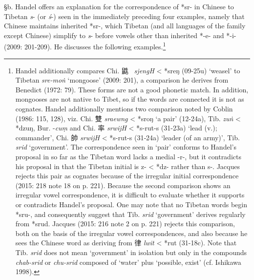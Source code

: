 §b. Handel offers an explanation for the correspondence of *sr- in
Chinese to Tibetan \emph{s}- (or \emph{ś}-) seen in the immediately
preceding four examples, namely that Chinese maintains inherited *sr-,
which Tibetan (and all languages of the family except Chinese) simplify
to \emph{s}- before vowels other than inherited *-e- and *-i- (2009:
201-209). He discusses the following examples.\footnote{Handel
  additionally compares Chi. 鼪~ \emph{sjengH} \textless{} *sreŋ (09-25u)
  `weasel' to Tibetan {} \emph{sre-moṅ} `mongoose' (2009: 201), a
  comparison he derives from Benedict (1972: 79). These forms are not a
  good phonetic match. In addition, mongooses are not native to Tibet,
  so if the words are connected it is not as cognates. Handel
  additionally mentions two comparison noted by Coblin (1986: 115, 128),
  viz. Chi. 雙  \emph{sraewng} \textless{} *s{}roŋ `a pair' (12-24a), Tib. {} \emph{zuṅ} \textless{} *dzuŋ, Bur.{} -\emph{cuṃ} and Chi. 率
   \emph{srwijH} \textless{} *s-rut-s (31-23a) `lead (v.); commander',
  Chi. 帥 \emph{srwijH} \textless{} *s-rut-s (31‑24a) `leader (of an
  army)', Tib. {} \emph{srid} `government'. The correspondence seen
  in `pair' conforms to Handel's proposal in so far as the Tibetan word
  lacks a medial -r-, but it contradicts his proposal in that the
  Tibetan initial is z- \textless{} *dz- rather than s-. Jacques rejects
  this pair as cognates because of the irregular initial correspondence
  (2015: 218 note 18 on p. 221). Because the second comparison shows an
  irregular vowel correspondence, it is difficult to evaluate whether it
  supports or contradicts Handel's proposal. One may note that no
  Tibetan words begin *sru-, and consequently suggest that Tib. {} \emph{srid} `government' derives regularly from *srud. Jacques (2015:
  216 note 2 on p. 221) rejects this comparison, both on the basis of
  the irregular vowel correspondences, and also because he sees the
  Chinese word as deriving from 律 \emph{lwit} \textless{} *rut
  (31-18c). Note that Tib. {} \emph{srid} does not mean `government'
  in isolation but only in the compounds 
  {} \emph{chab-srid} or
  {} \emph{chu-srid}
  composed of `water' plus `possible, exist'
  (cf. Ishikawa 1998).}

